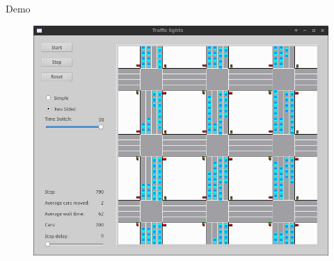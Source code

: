 \documentclass[11pt]{beamer}
\begin{document}
\begin{frame}{Demo}
\begin{figure}
\centering
\includegraphics[width=.8\textwidth]{vertical.png}
\end{figure}
\end{frame}
\end{document}

